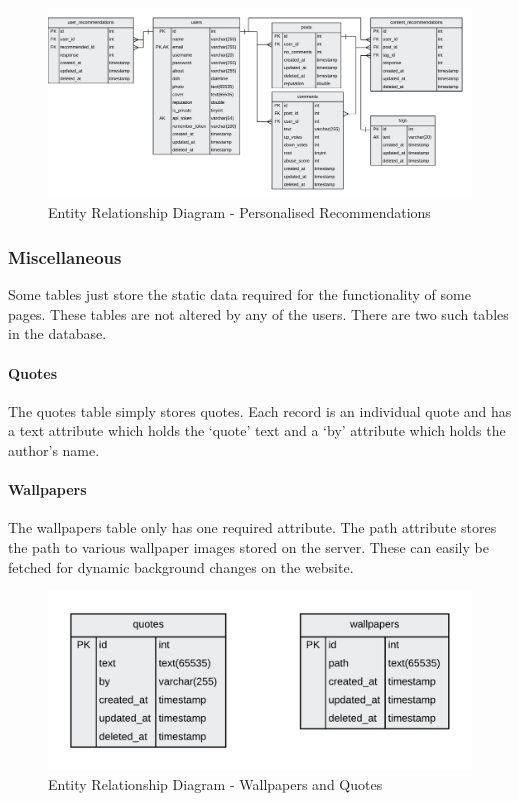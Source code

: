 \begin{figure}[H]
  \centering
  \includegraphics[width=1.0\textwidth]{Images/Design/Database/Recommendations}
  \caption{Entity Relationship Diagram - Personalised Recommendations} \label{fig:ERD_Recommendations}
\end{figure}

\subsubsection{Miscellaneous}
Some tables just store the static data required for the functionality of some pages. These tables are not altered by any of the users. There are two such tables in the database.

\paragraph{Quotes} The quotes table simply stores quotes. Each record is an individual quote and has a text attribute which holds the `quote' text and a `by' attribute which holds the author's name.

\paragraph{Wallpapers} The wallpapers table only has one required attribute. The path attribute stores the path to various wallpaper images stored on the server. These can easily be fetched for dynamic background changes on the website.

\begin{figure}[H]
  \centering
  \includegraphics[width=1.0\textwidth]{Images/Design/Database/Miscellaneous}
  \caption{Entity Relationship Diagram - Wallpapers and Quotes} \label{fig:ERD_Miscellaneous}
\end{figure}

